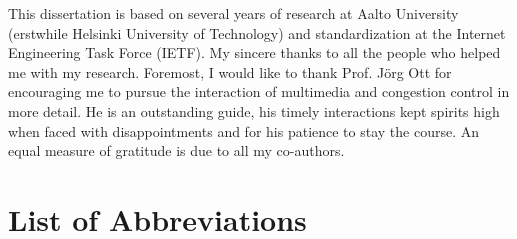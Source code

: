 \documentclass[dissertation,final]{aaltoseries} %
\begin{document}

\begin{preface}[Espoo]

This dissertation is based on several years of research at Aalto University
(erstwhile Helsinki University of Technology) and standardization at the
Internet Engineering Task Force (IETF). My sincere thanks to all the people
who helped me with my research. Foremost, I would like to thank Prof. Jörg Ott
for encouraging me to pursue the interaction of multimedia and congestion
control in more detail. He is an outstanding guide, his timely interactions
kept spirits high when faced with disappointments and for his patience to stay
the course. An equal measure of gratitude is due to all my co-authors. 


\end{preface}


\tableofcontents

\publicationpunctuation[]{,}{}{,}{,}{,}{}
\publicationformatting[]{}{}{\em}{}{}{}

\listofpublications


 \listoffigures
 \listoftables


%
%


\chapter*{List of Abbreviations}

\end{document}
